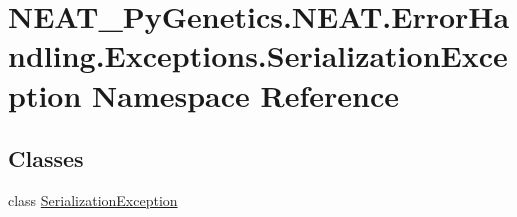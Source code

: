 \hypertarget{namespaceNEAT__PyGenetics_1_1NEAT_1_1ErrorHandling_1_1Exceptions_1_1SerializationException}{}\section{N\+E\+A\+T\+\_\+\+Py\+Genetics.\+N\+E\+A\+T.\+Error\+Handling.\+Exceptions.\+Serialization\+Exception Namespace Reference}
\label{namespaceNEAT__PyGenetics_1_1NEAT_1_1ErrorHandling_1_1Exceptions_1_1SerializationException}
\subsection*{Classes}
\begin{DoxyCompactItemize}
\item 
class \hyperlink{classNEAT__PyGenetics_1_1NEAT_1_1ErrorHandling_1_1Exceptions_1_1SerializationException_1_1SerializationException}{Serialization\+Exception}
\end{DoxyCompactItemize}
